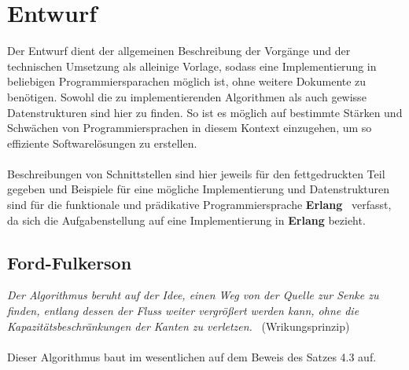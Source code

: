 \documentclass[11pt]{article}
\begin{document}
\section{Entwurf}
Der Entwurf dient der allgemeinen Beschreibung der Vorg\"ange und der technischen Umsetzung als alleinige Vorlage, sodass eine Implementierung in beliebigen Programmiersparachen m\"oglich ist, ohne weitere Dokumente zu ben\"otigen. Sowohl die zu implementierenden Algorithmen als auch gewisse Datenstrukturen sind hier zu finden. So ist es m\"oglich auf bestimmte St\"arken und Schw\"achen von Programmiersprachen in diesem Kontext einzugehen, um so effiziente Softwarel\"osungen zu erstellen.\\~\\
Beschreibungen von Schnittstellen sind hier jeweils f\"ur den fettgedruckten Teil gegeben und Beispiele f\"ur eine m\"ogliche Implementierung und Datenstrukturen sind f\"ur die funktionale und pr\"adikative Programmiersprache \textbf{Erlang}~\cite{erlwikipedia} verfasst, da sich die Aufgabenstellung auf eine Implementierung in \textbf{Erlang} bezieht.

\subsection{Ford-Fulkerson}
\textit{Der Algorithmus beruht auf der Idee, einen Weg von der Quelle zur Senke zu finden, entlang dessen der Fluss weiter vergr\"o\ss{}ert werden kann, ohne die Kapazit\"atsbeschr\"ankungen der Kanten zu verletzen.}~\cite{ffwikipedia} (Wrikungsprinzip)\\~\\
Dieser Algorithmus baut im wesentlichen auf dem Beweis des Satzes 4.3 auf.
\end{document}
